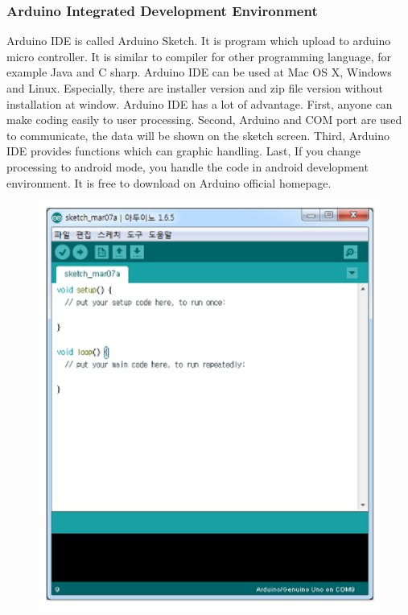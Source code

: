 \documentclass[conference]{IEEEtran}
\begin{document}
\subsubsection{Arduino Integrated Development Environment}
Arduino IDE is called Arduino Sketch. It is program which upload to arduino micro controller. It is similar to compiler for other programming language, for example Java and C sharp. Arduino IDE can be used at Mac OS X, Windows and Linux. Especially, there are installer version and zip file version without installation at window. Arduino IDE has a lot of advantage. First, anyone can make coding easily to user processing. Second, Arduino and COM port are used to communicate, the data will be shown on the sketch screen. Third, Arduino IDE provides functions which can graphic handling. Last, If you change processing to android mode, you handle the code in android development environment. It is free to download on Arduino official homepage.
\begin{figure}[H]
\begin{center}
    \includegraphics[scale=0.7]{arduinohp}
    \label{fig:label}
\end{center}
\end{figure}
\end{document}
